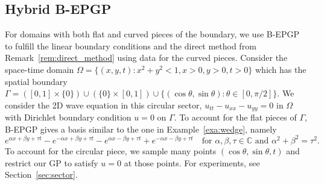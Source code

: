 \documentclass{article} %
\theoremstyle{plain}
\theoremstyle{definition}
\theoremstyle{remark}
\newenvironment{example}
  {\pushQED{\qed}\renewcommand{\qedsymbol}{$\triangle$}\examplex}
  {\popQED\endexamplex}
\newcommand{\CC}{\mathbb{C}}
\begin{document}
\subsection{Hybrid B-EPGP}\label{sec:hybrid}
For domains with both flat and curved pieces of the boundary, we use B-EPGP to fulfill the linear boundary conditions   and the direct method from Remark~\ref{rem:direct_method} using data for the curved pieces.
\begin{example}[Circular sector]\label{exa:sector}
    Consider the space-time domain $\Omega=\{(x,y,t)\colon x^2+y^2< 1,x>0,y>0,t>0\}$ which has the spatial boundary $\Gamma=\left([0,1]\times\{0\}\right)\cup \left(\{0\}\times [0,1]\right)\cup\{(\cos \theta,\sin\theta)\colon \theta\in[0,\pi/2]\}$. %
     We consider the 2D wave equation in this circular sector,  $u_{tt}-u_{xx}-u_{yy}=0\text{ in }\Omega$ with Dirichlet boundary condition $u=0$ on $\Gamma$.
    To account for the flat pieces of $\Gamma$, B-EPGP gives a basis similar to the one in Example~\ref{exa:wedge}, namely
    $$
     e^{\alpha x+\beta y+\tau t}-e^{-\alpha x+\beta y+\tau t}-e^{\alpha x-\beta y+\tau t}+e^{-\alpha x-\beta y+\tau t}\quad\text{for $\alpha,\beta,\tau\in\CC$ and $\alpha^2+\beta^2=\tau^2$.}
    $$
     To account for the circular piece, we sample many points $(\cos \theta,\sin\theta,t)$ and restrict our GP to satisfy $u=0$ at those points. For experiments, see Section~\ref{sec:sector}.
\end{example}
\end{document}
